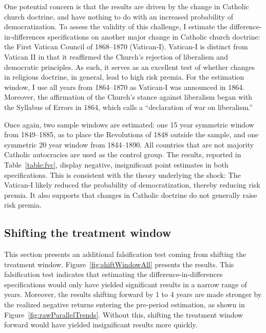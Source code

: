 One potential concern is that the results are driven by the change in Catholic church doctrine, and have nothing to do with an increased probability of democratization. To assess the validity of this challenge, I estimate the difference-in-differences specifications on another major change in Catholic church doctrine: the First Vatican Council of 1868--1870 (Vatican-I). Vatican-I is distinct from Vatican II in that it reaffirmed the Church's rejection of liberalism and democratic principles. As such, it serves as an excellent test of whether changes in religious doctrine, in general, lead to high risk premia. For the estimation window, I use all years from 1864--1870 as Vatican-I was announced in 1864. Moreover, the affirmation of the Church's stance against liberalism began with the Syllabus of Errors in 1864, which \cite{Luebbert1991} calls a ``declaration of war on liberalism.'' 

Once again, two sample windows are estimated: one 15 year symmetric window from 1849--1885, as to place the Revolutions of 1848 outside the sample, and one symmetric 20 year window from 1844--1890. All countries that are not majority Catholic autocracies are used as the control group. The results, reported in Table~\ref{table:fvc}, display negative, insignificant point estimates in both specifications. This is consistent with the theory underlying the shock: The Vatican-I likely reduced the probability of democratization, thereby reducing risk premia. It also supports that changes in Catholic doctrine do not generally raise risk premia.



\subsection{Shifting the treatment window}\label{section:shiftWindow}

This section presents an additional falsification test coming from shifting the treatment window. Figure~\ref{fig:shiftWindowAll} presents the results. This falsification test indicates that estimating the difference-in-differences specifications would only have yielded significant results in a narrow range of years. Moreover, the results shifting forward by 1 to 4 years are made stronger by the realized negative returns entering the pre-period estimation, as shown in Figure~\ref{fig:rawParallelTrends}.  Without this, shifting the treatment window forward would have yielded insignificant results more quickly. 

